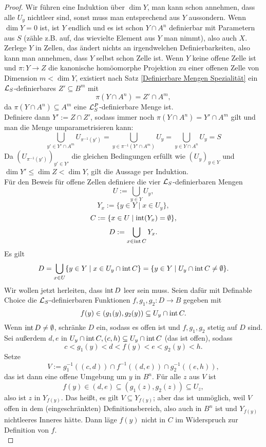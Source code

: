 \begin{proof}
	Wir führen eine Induktion über $\dim Y$, man kann schon annehmen, dass alle $U_y$ nichtleer sind, sonst muss man entsprechend aus $Y$ aussondern. Wenn $\dim Y=0$ ist, ist $Y$ endlich und es ist schon $Y\cap A^n$ definierbar mit Parametern aus $S$ (zähle z.B. auf, das wievielte Element aus $Y$ man nimmt), also auch $X$.\\
	Zerlege $Y$ in Zellen, das ändert nichts an irgendwelchen Definierbarkeiten, also kann man annehmen, dass $Y$ selbst schon Zelle ist. Wenn $Y$ keine offene Zelle ist und ${\pi:Y\rightarrow Z}$ die kanonische homöomorphe Projektion zu einer offenen Zelle von Dimension $m<\dim Y$, existiert nach Satz \ref{Definierbare Mengen Spezialität} ein $\mathcal{L}_S$-definierbares $Z'\subseteq B^m$ mit $$\pi(Y\cap A^n)=Z'\cap A^m,$$ da $\pi(Y\cap A^n)\subseteq A^m$ eine $\mathcal{L}^P_S$-definierbare Menge ist.\\
	Definiere dann $Y':=Z\cap Z'$, sodass immer noch $\pi(Y\cap A^n)=Y'\cap A^m$ gilt und man die Menge umparametrisieren kann:
	$$\bigcup\limits_{y'\in Y'\cap A^m}U_{\pi^{-1}(y')}=\bigcup\limits_{y\in\pi^{-1}(Y'\cap A^m)}U_y=\bigcup\limits_{y\in Y\cap A^n}U_y=S$$
	Da $(U_{\pi^{-1}(y')})_{y'\in Y'}$ die gleichen Bedingungen erfüllt wie $(U_y)_{y\in Y}$ und $\dim Y'\leq\dim Z<\dim Y$, gilt die Aussage per Induktion.\\
	Für den Beweis für offene Zellen definiere die vier $\mathcal{L}_S$-definierbaren Mengen $$U:=\bigcup\limits_{y\in Y}U_y,$$ $$Y_x:=\{y\in Y\mid x\in U_y\},$$ $$C:=\{x\in U\mid\operatorname{int}(Y_x)=\emptyset\},$$ $$D:=\bigcup\limits_{x\in\operatorname{int} C}Y_x.$$
	Es gilt $$D=\bigcup\limits_{x\in U}\{y\in Y\mid x\in U_y\cap\operatorname{int} C\}=\{y\in Y\mid U_y\cap\operatorname{int} C\neq\emptyset\}.$$
	Wir wollen jetzt herleiten, dass $\operatorname{int} D$ leer sein muss. Seien dafür mit Definable Choice die $\mathcal{L}_S$-definierbaren Funktionen $f,g_1,g_2:D\rightarrow B$ gegeben mit $$f(y)\in(g_1(y),g_2(y))\subseteq U_y\cap\operatorname{int} C.$$
	Wenn $\operatorname{int} D\neq\emptyset$, schränke $D$ ein, sodass es offen ist und $f,g_1,g_2$ stetig auf $D$ sind. Sei außerdem $d,e$ in $U_y\cap\operatorname{int} C, (c,h)\subseteq U_y\cap\operatorname{int} C$ (das ist offen), sodass $$c<g_1(y)<d<f(y)<e<g_2(y)<h.$$ Setze $$V:=g_1^{-1}((c,d))\cap f^{-1}((d,e))\cap g_2^{-1}((e,h)),$$ das ist dann eine offene Umgebung um $y$ in $B^n$. Für alle $z$ aus $V$ ist $$f(y)\in(d,e)\subseteq(g_1(z),g_2(z))\subseteq U_z,$$ also ist $z$ in $Y_{f(y)}$.\newpage
	Das heißt, es gilt $V\subseteq Y_{f(y)}$; aber das ist unmöglich, weil $V$ offen in dem (eingeschränkten) Definitionsbereich, also auch in $B^n$ ist und $Y_{f(y)}$ nichtleeres Inneres hätte. Dann läge $f(y)$ nicht in $C$ im Widerspruch zur Definition von $f$.\\

\end{proof}
